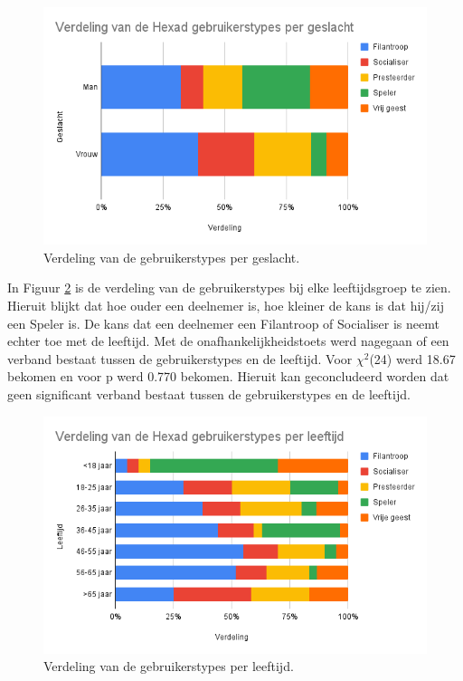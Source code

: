 \begin{figure}
    \includegraphics[width=\linewidth]{VerdelingGeslacht.png}
    \caption{Verdeling van de gebruikerstypes per geslacht.}
    \label{fig:verdelinggeslacht}
\end{figure}

In Figuur \ref{fig:verdelingleeftijd} is de verdeling van de gebruikerstypes bij elke leeftijdsgroep te zien. Hieruit blijkt dat hoe ouder een deelnemer is, hoe kleiner de kans is dat hij/zij een Speler is. De kans dat een deelnemer een Filantroop of Socialiser is neemt echter toe met de leeftijd. Met de onafhankelijkheidstoets werd nagegaan of een verband bestaat tussen de gebruikerstypes en de leeftijd. Voor $\chi^2$(24) werd 18.67 bekomen en voor p werd 0.770 bekomen. Hieruit kan geconcludeerd worden dat geen significant verband bestaat tussen de gebruikerstypes en de leeftijd.

\begin{figure}
    \includegraphics[width=\linewidth]{VerdelingLeeftijd.png}
    \caption{Verdeling van de gebruikerstypes per leeftijd.}
    \label{fig:verdelingleeftijd}
\end{figure}

